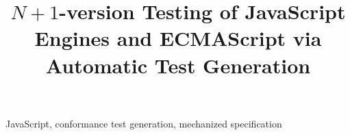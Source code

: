 \documentclass[10pt,conference]{IEEEtran}
\begin{document}
\title{$N\!+\!1$-version Testing of JavaScript Engines and ECMAScript
via Automatic Test Generation
}

\author{
}

% 
% 
% 
% 
% 
% 

\maketitle



\begin{IEEEkeywords}
JavaScript, conformance test generation, mechanized specification
\end{IEEEkeywords}












\end{document}
